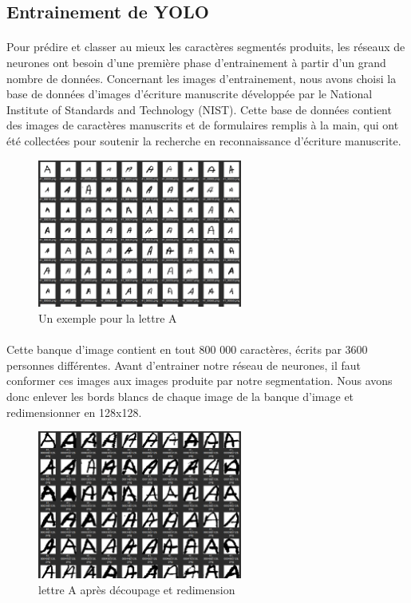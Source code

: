 \documentclass[a4paper]{article}
\begin{document}
		\subsection{Entrainement de YOLO}

			\paragraph{} Pour prédire et classer au mieux les caractères segmentés produits, les réseaux de neurones ont besoin d'une première phase d'entrainement à partir d'un grand nombre de données.
			Concernant les images d'entrainement, nous avons choisi la base de données d'images d'écriture manuscrite développée par le National Institute of Standards and Technology (NIST).
			Cette base de données contient des images de caractères manuscrits et de formulaires remplis à la main, qui ont été collectées pour soutenir la recherche en reconnaissance d'écriture manuscrite.
			
			\begin{figure}[h]
				\centering
				\includegraphics[width=0.6\textwidth]{lettreABDD.png}
				\caption{Un exemple pour la lettre A}
				\label{fig:BDDNIST}
			\end{figure}
		
			\paragraph{} Cette banque d'image contient en tout 800 000 caractères, écrits par 3600 personnes différentes. Avant d'entrainer notre réseau de neurones,
			il faut conformer ces images aux images produite par notre segmentation. Nous avons donc enlever les bords blancs de chaque image de la banque d'image et redimensionner en 128x128.


			\begin{figure}[h]
				\centering
				\includegraphics[width=0.6\textwidth]{lettreASansBordBDD.png}
				\caption{lettre A après découpage et redimension}
				\label{fig:BDDNISTsansBord}
			\end{figure}
\end{document}
